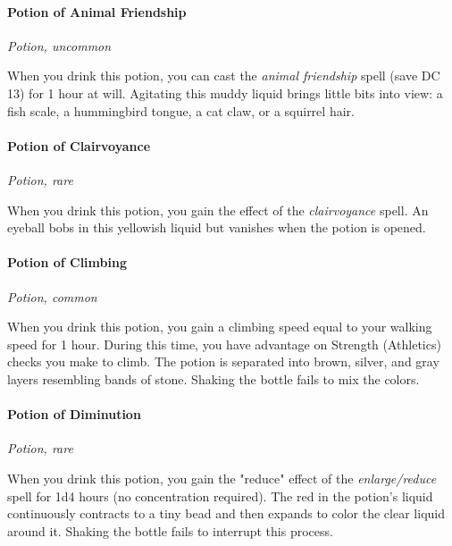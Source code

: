 \documentclass[
]{article}
\begin{document}
\hypertarget{potion-of-animal-friendship}{%
\paragraph{Potion of Animal
Friendship}\label{potion-of-animal-friendship}}

\emph{Potion, uncommon}

When you drink this potion, you can cast the \emph{animal friendship}
spell (save DC 13) for 1 hour at will. Agitating this muddy liquid
brings little bits into view: a fish scale, a hummingbird tongue, a cat
claw, or a squirrel hair.

\hypertarget{potion-of-clairvoyance}{%
\paragraph{Potion of Clairvoyance}\label{potion-of-clairvoyance}}

\emph{Potion, rare}

When you drink this potion, you gain the effect of the
\emph{clairvoyance} spell. An eyeball bobs in this yellowish liquid but
vanishes when the potion is opened.

\hypertarget{potion-of-climbing}{%
\paragraph{Potion of Climbing}\label{potion-of-climbing}}

\emph{Potion, common}

When you drink this potion, you gain a climbing speed equal to your
walking speed for 1 hour. During this time, you have advantage on
Strength (Athletics) checks you make to climb. The potion is separated
into brown, silver, and gray layers resembling bands of stone. Shaking
the bottle fails to mix the colors.

\hypertarget{potion-of-diminution}{%
\paragraph{Potion of Diminution}\label{potion-of-diminution}}

\emph{Potion, rare}

When you drink this potion, you gain the "reduce" effect of the
\emph{enlarge/reduce} spell for 1d4 hours (no concentration required).
The red in the potion's liquid continuously contracts to a tiny bead and
then expands to color the clear liquid around it. Shaking the bottle
fails to interrupt this process.
\end{document}
